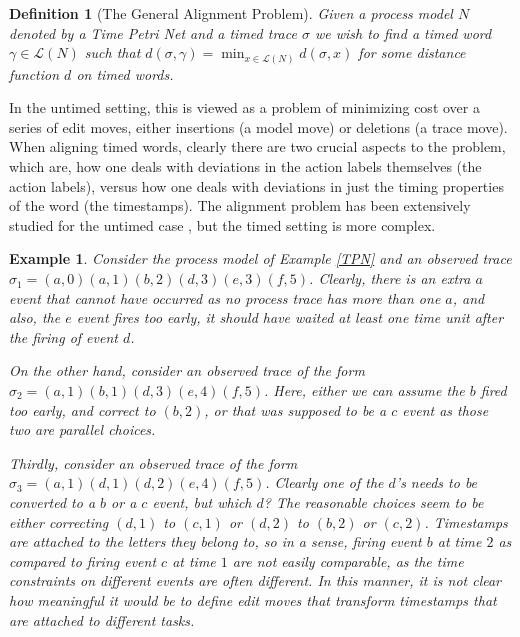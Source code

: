 \documentclass[conference]{IEEEtran}
\newtheorem{definition}{Definition}
\newtheorem{example}{Example}
\begin{document}
	\begin{definition}[The General Alignment Problem]
		Given a process model $N$ denoted by a Time Petri Net and a timed trace $\sigma$ we wish to find a timed word $\gamma \in \mathcal{L}(N)$ such that $d(\sigma, \gamma) = \min_{x \in \mathcal{L}(N)}{d(\sigma, x)}$ for some distance function $d$ on timed words. 
	\end{definition}
	
	In the untimed setting, this is viewed as a problem of minimizing cost over a series of edit moves, either insertions (a model move) or deletions (a trace move). When aligning timed words, clearly there are two crucial aspects to the problem, which are, how one deals with deviations in the action labels themselves (the action labels), versus how one deals with deviations in just the timing properties of the word (the timestamps). The alignment problem has been extensively studied for the untimed case \cite{Adriansyah2014AligningOA} \cite{BCC21}, %
	but the timed setting is more complex. 
	
	\begin{example}
		Consider the process model of Example \ref{TPN} and an observed trace $\sigma_1 = (a, 0)(a, 1)(b,2)(d,3)(e,3)(f,5)$. Clearly, there is an extra $a$ event that cannot have occurred as no process trace has more than one $a$, and also, the $e$ event fires too early, it should have waited at least one time unit after the firing of event $d$. 
		
		On the other hand, consider an observed trace of the form $\sigma_2 = (a, 1)(b,1)(d,3)(e,4)(f,5)$. Here, either we can assume the $b$ fired too early, and correct to $(b,2)$, or that was supposed to be a $c$ event as those two are parallel choices. 
		
		Thirdly, consider an observed trace of the form $\sigma_3 = (a, 1)(d,1)(d,2)(e,4)(f,5)$. Clearly one of the $d$'s needs to be converted to a $b$ or a $c$ event, but which $d$? The reasonable choices seem to be either correcting $(d,1)$ to $(c,1)$ or $(d,2)$ to $(b,2)$ or $(c,2)$. 
		Timestamps are attached to the letters they belong to, so in a sense, firing event $b$ at time $2$ as compared to firing event $c$ at time $1$ are not easily comparable, as the time constraints on different events are often different. In this manner, it is not clear how meaningful it would be to define edit moves that transform timestamps that are attached to different tasks. 
	\end{example}
	
\end{document}
